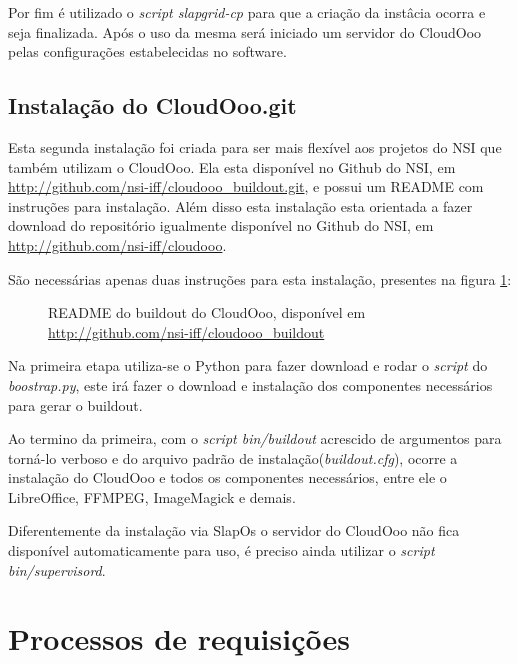Por fim é utilizado o \textit{script slapgrid-cp} para que a criação da instâcia ocorra e seja finalizada. Após o uso da mesma será iniciado um servidor do CloudOoo pelas configurações estabelecidas no software.

\subsection{Instalação do CloudOoo.git}

Esta segunda instalação foi criada para ser mais flexível aos projetos do NSI que também utilizam o CloudOoo. Ela esta disponível no Github do NSI, em \url{http://github.com/nsi-iff/cloudooo_buildout.git}, e possui um README com instruções para instalação. Além disso esta instalação esta orientada a fazer download do repositório igualmente disponível no Github do NSI, em \url{http://github.com/nsi-iff/cloudooo}.

São necessárias apenas duas instruções para esta instalação, presentes na figura \ref{buildout-cloudooo}:

\begin{figure}[ht]
    \centering
    \caption{README do buildout do CloudOoo, disponível em \url{http://github.com/nsi-iff/cloudooo_buildout}}
    \label{buildout-cloudooo}
\end{figure}

Na primeira etapa utiliza-se o Python para fazer download e rodar o \textit{script} do \textit{boostrap.py}, este irá fazer o download e instalação dos componentes necessários para gerar o buildout. 

Ao termino da primeira, com o \textit{script bin/buildout} acrescido de argumentos para torná-lo verboso e do arquivo padrão de instalação(\textit{buildout.cfg}), ocorre a instalação do CloudOoo e todos os componentes necessários, entre ele o LibreOffice, FFMPEG, ImageMagick e demais.

Diferentemente da instalação via SlapOs o servidor do CloudOoo não fica disponível automaticamente para uso, é preciso ainda utilizar o \textit{script bin/supervisord}.

\section{Processos de requisições}

